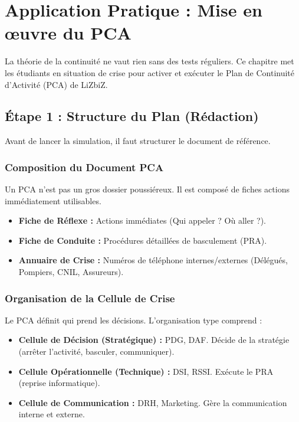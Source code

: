 \chapter{Application Pratique : Mise en œuvre du PCA}
\label{chap:apppca}

La théorie de la continuité ne vaut rien sans des tests réguliers. Ce chapitre met les étudiants en situation de crise pour activer et exécuter le Plan de Continuité d'Activité (PCA) de LiZbiZ.

\section{Étape 1 : Structure du Plan (Rédaction)}

Avant de lancer la simulation, il faut structurer le document de référence.

\subsection{Composition du Document PCA}

Un PCA n'est pas un gros dossier poussiéreux. Il est composé de fiches actions immédiatement utilisables.

\begin{itemize}
    \item \textbf{Fiche de Réflexe :} Actions immédiates (Qui appeler ? Où aller ?).
    \item \textbf{Fiche de Conduite :} Procédures détaillées de basculement (PRA).
    \item \textbf{Annuaire de Crise :} Numéros de téléphone internes/externes (Délégués, Pompiers, CNIL, Assureurs).
\end{itemize}

\subsection{Organisation de la Cellule de Crise}

Le PCA définit qui prend les décisions. L'organisation type comprend :

\begin{itemize}
    \item \textbf{Cellule de Décision (Stratégique) :} PDG, DAF. Décide de la stratégie (arrêter l'activité, basculer, communiquer).
    \item \textbf{Cellule Opérationnelle (Technique) :} DSI, RSSI. Exécute le PRA (reprise informatique).
    \item \textbf{Cellule de Communication :} DRH, Marketing. Gère la communication interne et externe.
\end{itemize}

